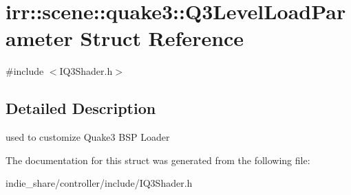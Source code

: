 \hypertarget{structirr_1_1scene_1_1quake3_1_1Q3LevelLoadParameter}{}\section{irr\+:\+:scene\+:\+:quake3\+:\+:Q3\+Level\+Load\+Parameter Struct Reference}
\label{structirr_1_1scene_1_1quake3_1_1Q3LevelLoadParameter}


{\ttfamily \#include $<$I\+Q3\+Shader.\+h$>$}



\subsection{Detailed Description}
used to customize Quake3 B\+SP Loader 

The documentation for this struct was generated from the following file\+:\begin{DoxyCompactItemize}
\item 
indie\+\_\+share/controller/include/I\+Q3\+Shader.\+h\end{DoxyCompactItemize}
